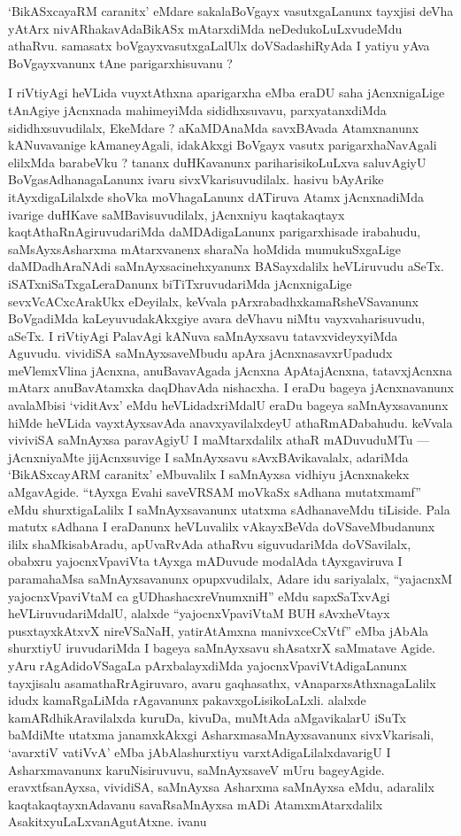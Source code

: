 \begin{artha}
`BikASxcayaRM caranitx' eMdare sakalaBoVgayx vasutxgaLanunx tayxjisi deVha yAtArx nivARhakavAdaBikASx mAtarxdiMda neDedukoLuLxvudeMdu athaRvu. samasatx boVgayxvasutxgaLalUlx doVSadashiRyAda I yatiyu yAva BoVgayxvanunx tAne parigarxhisuvanu ?
\end{artha}

\begin{artha}
I riVtiyAgi heVLida vuyxtAthxna aparigarxha eMba eraDU saha jAcnxnigaLige tAnAgiye jAcnxnada mahimeyiMda sididhxsuvavu, parxyatanxdiMda sididhxsuvudilalx, EkeMdare ? aKaMDAnaMda savxBAvada Atamxnanunx kANuvavanige kAmaneyAgali, idakAkxgi BoVgayx vasutx parigarxhaNavAgali elilxMda barabeVku ? tananx duHKavanunx pariharisikoLuLxva saluvAgiyU BoVgasAdhanagaLanunx ivaru sivxVkarisuvudilalx. hasivu bAyArike itAyxdigaLilalxde shoVka moVhagaLanunx dATiruva Atamx jAcnxnadiMda ivarige duHKave saMBavisuvudilalx, jAcnxniyu kaqtakaqtayx kaqtAthaRnAgiruvudariMda daMDAdigaLanunx parigarxhisade irabahudu, saMsAyxsAsharxma mAtarxvanenx sharaNa hoMdida mumukuSxgaLige daMDadhAraNAdi saMnAyxsacinehxyanunx BASayxdalilx heVLiruvudu aSeTx. iSATxniSaTxgaLeraDanunx biTiTxruvudariMda jAcnxnigaLige sevxVcACxcArakUkx eDeyilalx, keVvala pArxrabadhxkamaRsheVSavanunx BoVgadiMda kaLeyuvudakAkxgiye avara deVhavu niMtu vayxvaharisuvudu, aSeTx. I riVtiyAgi PalavAgi kANuva saMnAyxsavu tatavxvideyxyiMda Aguvudu. vividiSA saMnAyxsaveMbudu apAra jAcnxnasavxrUpadudx meVlemxVlina jAcnxna, anuBavavAgada jAcnxna ApAtajAcnxna, tatavxjAcnxna mAtarx anuBavAtamxka daqDhavAda nishacxha. I eraDu bageya jAcnxnavanunx avalaMbisi `viditAvx' eMdu heVLidadxriMdalU eraDu bageya saMnAyxsavanunx hiMde heVLida vayxtAyxsavAda anavxyavilalxdeyU athaRmADabahudu. keVvala viviviSA saMnAyxsa paravAgiyU I maMtarxdalilx athaR mADuvuduMTu --- jAcnxniyaMte jijAcnxsuvige I saMnAyxsavu sAvxBAvikavalalx, adariMda `BikASxcayARM caranitx' eMbuvalilx I saMnAyxsa vidhiyu jAcnxnakekx aMgavAgide. ``tAyxga Evahi saveVRSAM moVkaSx sAdhana mutatxmamf'' eMdu shurxtigaLalilx I saMnAyxsavanunx utatxma sAdhanaveMdu tiLiside. Pala matutx sAdhana I eraDanunx heVLuvalilx vAkayxBeVda doVSaveMbudanunx ililx shaMkisabAradu, apUvaRvAda athaRvu siguvudariMda doVSavilalx, obabxru yajocnxVpaviVta tAyxga mADuvude modalAda tAyxgaviruva I paramahaMsa saMnAyxsavanunx opupxvudilalx, Adare idu sariyalalx, ``yajacnxM yajocnxVpaviVtaM ca gUDhashacxreVnumxniH'' eMdu sapxSaTxvAgi heVLiruvudariMdalU, alalxde ``yajocnxVpaviVtaM BUH sAvxheVtayx pusxtayxkAtxvX nireVSaNaH, yatirAtAmxna manivxceCxVtf'' eMba jAbAla shurxtiyU iruvudariMda I bageya saMnAyxsavu shAsatxrX saMmatave Agide. yAru rAgAdidoVSagaLa pArxbalayxdiMda yajocnxVpaviVtAdigaLanunx tayxjisalu asamathaRrAgiruvaro, avaru gaqhasathx, vAnaparxsAthxnagaLalilx idudx kamaRgaLiMda rAgavanunx pakavxgoLisikoLaLxli. alalxde kamARdhikAravilalxda kuruDa, kivuDa, muMtAda aMgavikalarU iSuTx baMdiMte utatxma janamxkAkxgi AsharxmasaMnAyxsavanunx sivxVkarisali, `avarxtiV vatiVvA' eMba jAbAlashurxtiyu varxtAdigaLilalxdavarigU I Asharxmavanunx karuNisiruvuvu, saMnAyxsaveV mUru bageyAgide. eravxtfsanAyxsa, vividiSA, saMnAyxsa Asharxma saMnAyxsa eMdu, adaralilx kaqtakaqtayxnAdavanu savaRsaMnAyxsa mADi AtamxmAtarxdalilx AsakitxyuLaLxvanAgutAtxne. ivanu 
\end{artha}
